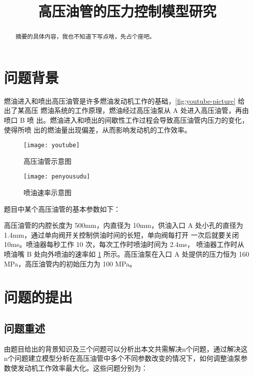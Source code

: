 \documentclass{cumcmthesis}
\title{高压油管的压力控制模型研究}
\begin{document}
\maketitle

 
 \begin{abstract}
 	摘要的具体内容，我也不知道下写点啥，先占个座吧。
 \end{abstract}

\tableofcontents

\newpage
\section{问题背景}
燃油进入和喷出高压油管是许多燃油发动机工作的基础，\cref{fig:youtube-picture} 给出了某高压
燃油系统的工作原理，燃油经过高压油泵从 A 处进入高压油管，再由喷口 B 喷
出。燃油进入和喷出的间歇性工作过程会导致高压油管内压力的变化，使得所喷
出的燃油量出现偏差，从而影响发动机的工作效率。

\begin{figure}[!h]
	\centering %
	\begin{minipage}[b]{0.4\textwidth} %
		\centering %
		\texttt{[image: youtube]} %
		\caption{高压油管示意图}
		\label{fig:youtube-picture}
	\end{minipage}
	\begin{minipage}[b]{0.4\textwidth} %
		\centering %
		\texttt{[image: penyousudu]}%
		\caption{喷油速率示意图}
		\label{fig:penyou-picture}
	\end{minipage}
\end{figure}
题目中某个高压油管的基本参数如下：

高压油管的内腔长度为 500mm，内直径为 10mm，供油入口
A 处小孔的直径为 1.4mm，通过单向阀开关控制供油时间的长短，单向阀每打开
一次后就要关闭 10ms。喷油器每秒工作 10 次，每次工作时喷油时间为 2.4ms，
喷油器工作时从喷油嘴 B 处向外喷油的速率如 \cref{fig:penyou-picture} 所示。高压油泵在入口 A 处提供的压力恒为 160 MPa，高压油管内的初始压力为 100 MPa。
\section{问题的提出}
\subsection{问题重述}
由题目给出的背景知识及三个问题可以分析出本文共需解决n个问题，通过解决这n个问题建立模型分析在高压油管中多个不同参数改变的情况下，如何调整油泵参数使发动机工作效率最大化。这些问题分别为：
\end{document}
